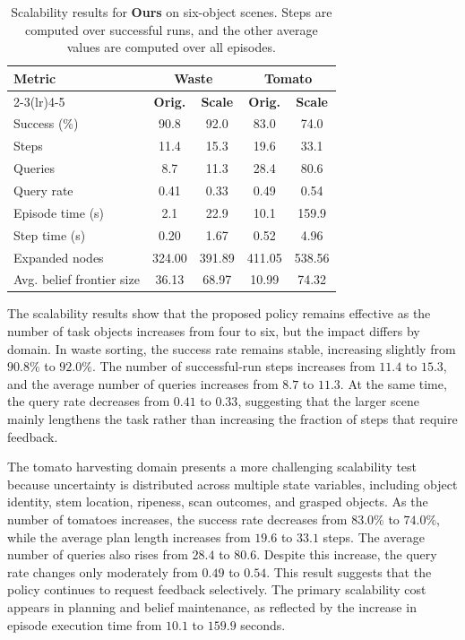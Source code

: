 \begin{table}[t]
\centering
\caption{Scalability results for \textbf{Ours} on six-object scenes. Steps are computed over successful runs, and the other average values are computed over all episodes.}
\label{tab:sys_scale}
\footnotesize
\setlength{\tabcolsep}{0pt}
\begin{tabular*}{\columnwidth}{@{\extracolsep{\fill}}lcccc}
\toprule
\multirow{2}{*}{\textbf{Metric}} & \multicolumn{2}{c}{\textbf{Waste}} & \multicolumn{2}{c}{\textbf{Tomato}} \\
\cmidrule(lr){2-3}\cmidrule(lr){4-5}
& \textbf{Orig.} & \textbf{Scale} & \textbf{Orig.} & \textbf{Scale} \\
\midrule
Success (\%)        & 90.8 & 92.0 & 83.0 & 74.0 \\
Steps               & 11.4 & 15.3 & 19.6 & 33.1 \\
Queries             & 8.7  & 11.3 & 28.4 & 80.6 \\
Query rate          & 0.41 & 0.33 & 0.49 & 0.54 \\
Episode time (s)    & 2.1  & 22.9 & 10.1 & 159.9 \\
Step time (s)       & 0.20 & 1.67 & 0.52 & 4.96 \\
Expanded nodes      & 324.00 & 391.89 & 411.05 & 538.56 \\
Avg. belief frontier size & 36.13 & 68.97 & 10.99 & 74.32 \\
\bottomrule
\end{tabular*}
\end{table}

The scalability results show that the proposed policy remains effective as the number of task objects increases from four to six, but the impact differs by domain. In waste sorting, the success rate remains stable, increasing slightly from $90.8\%$ to $92.0\%$. The number of successful-run steps increases from $11.4$ to $15.3$, and the average number of queries increases from $8.7$ to $11.3$. At the same time, the query rate decreases from $0.41$ to $0.33$, suggesting that the larger scene mainly lengthens the task rather than increasing the fraction of steps that require feedback.


The tomato harvesting domain presents a more challenging scalability test because uncertainty is distributed across multiple state variables, including object identity, stem location, ripeness, scan outcomes, and grasped objects. As the number of tomatoes increases, the success rate decreases from $83.0\%$ to $74.0\%$, while the average plan length increases from $19.6$ to $33.1$ steps. The average number of queries also rises from $28.4$ to $80.6$. Despite this increase, the query rate changes only moderately from $0.49$ to $0.54$. This result suggests that the policy continues to request feedback selectively. The primary scalability cost appears in planning and belief maintenance, as reflected by the increase in episode execution time from $10.1$ to $159.9$ seconds.

